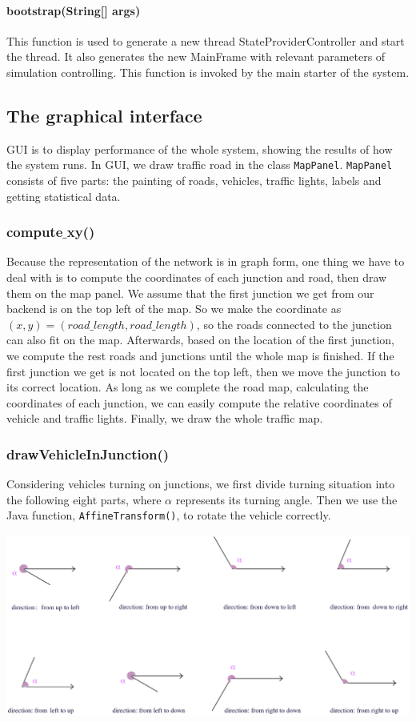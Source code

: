 \documentclass[a4paper,12pt]{article}
\begin{document}
\paragraph{bootstrap(String[] args)} This function is used to generate a new thread StateProviderController and start the thread. It also generates the new MainFrame with relevant parameters of simulation controlling. This function is invoked by the main starter of the system.

\subsection{The graphical interface}

GUI is to display performance of the whole system, showing the results of how the system runs. In GUI, we draw traffic road in the class \verb|MapPanel|. \verb|MapPanel| consists of five parts: the painting of roads, vehicles, traffic lights, labels and getting statistical data.

\subsubsection{compute$\_$xy()}
Because the representation of the network is in graph form, one thing we have to deal with is to compute the coordinates of each junction and road, then draw them on the map panel. We assume that the first junction we get from our backend is on the top left of the map. So we make the coordinate as $(x,y)=(road\_length, road\_length)$, so the roads connected to the junction can also fit on the map. Afterwards, based on the location of the first junction, we compute the rest roads and junctions until the whole map is finished. If the first junction we get is not located on the top left, then we move the junction to its correct location. As long as we complete the road map, calculating the coordinates of each junction, we can easily compute the relative coordinates of vehicle and traffic lights. Finally, we draw the whole traffic map.

\subsubsection{drawVehicleInJunction()}
Considering vehicles turning on junctions, we first divide turning situation into the following eight parts, where $\alpha$ represents its turning angle. Then we use the Java function, \verb|AffineTransform()|, to rotate the vehicle correctly.
\begin{center}
	\includegraphics[width=14cm]{GUI_p1.eps}
\end{center}
\end{document}
